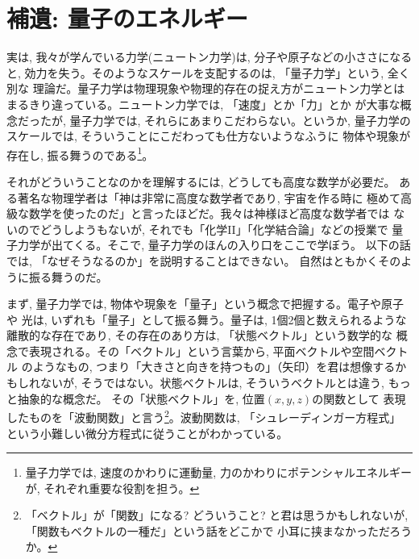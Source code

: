 \section{補遺: 量子のエネルギー}

実は, 我々が学んでいる力学(ニュートン力学)は, 分子や原子などの小ささになると, 
効力を失う。そのようなスケールを支配するのは, 「量子力学」という, 全く別な
理論だ。量子力学は物理現象や物理的存在の捉え方がニュートン力学とは
まるきり違っている。ニュートン力学では, 「速度」とか「力」とか
が大事な概念だったが, 量子力学では, それらにあまりこだわらない。というか, 
量子力学のスケールでは, そういうことにこだわっても仕方ないようなふうに
物体や現象が存在し, 振る舞うのである\footnote{量子力学では, 
速度のかわりに運動量, 力のかわりにポテンシャルエネルギーが, 
それぞれ重要な役割を担う。}。

それがどういうことなのかを理解するには, どうしても高度な数学が必要だ。
ある著名な物理学者は「神は非常に高度な数学者であり, 宇宙を作る時に
極めて高級な数学を使ったのだ」と言ったほどだ。我々は神様ほど高度な数学者では
ないのでどうしようもないが, それでも「化学II」「化学結合論」などの授業で
量子力学が出てくる。そこで, 量子力学のほんの入り口をここで学ぼう。
以下の話では, 「なぜそうなるのか」を説明することはできない。
自然はともかくそのように振る舞うのだ。

まず, 量子力学では, 物体や現象を「量子」という概念で把握する。電子や原子や
光は, いずれも「量子」として振る舞う。量子は, 1個2個と数えられるような
離散的な存在であり, その存在のあり方は, 「状態ベクトル」という数学的な
概念で表現される。その「ベクトル」という言葉から, 平面ベクトルや空間ベクトル
のようなもの, つまり「大きさと向きを持つもの」（矢印）を君は想像するかもしれないが, 
そうではない。状態ベクトルは, そういうベクトルとは違う, もっと抽象的な概念だ。
その「状態ベクトル」を, 位置$(x, y, z)$の関数として
表現したものを「波動関数」と言う\footnote{「ベクトル」が「関数」になる? どういうこと?
 と君は思うかもしれないが, 「関数もベクトルの一種だ」という話をどこかで
小耳に挟まなかっただろうか。}。波動関数は, 「シュレーディンガー方程式」
という小難しい微分方程式に従うことがわかっている。


